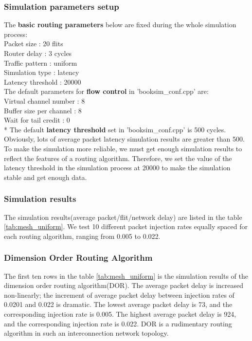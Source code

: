 \subsubsection{Simulation parameters setup}
The \textbf{basic routing parameters} below are fixed during the whole simulation process:\\
Packet size : 20 flits\\
Router delay : 3 cycles\\
Traffic pattern : uniform\\
Simulation type : latency\\
Latency threshold : 20000\\
The default parameters for \textbf{flow control} in 'booksim\_conf.cpp' are: \\
Virtual channel number : 8\\
Buffer size per channel : 8\\
Wait for tail credit : 0\\

* The default \textbf{latency threshold} set in 'booksim\_conf.cpp' is 500 cycles. Obviously, lots of average packet latency simulation results are greater than 500. To make the simulation more reliable, we must get enough simulation results to reflect the features of a routing algorithm. Therefore, we set the value of the latency threshold in the simulation process at 20000 to make the simulation stable and get enough data.
\subsubsection{Simulation results}

The simulation results(average packet/flit/network delay) are listed in the table \ref{tab:mesh_uniform}. We test 10 different packet injection rates equally spaced for each routing algorithm, ranging from 0.005 to 0.022.


\subsubsection{Dimension Order Routing Algorithm}
The first ten rows in the table \ref{tab:mesh_uniform} is the simulation results of the dimension order routing algorithm(DOR). The average packet delay is increased non-linearly; the increment of average packet delay between injection rates of 0.0201 and 0.022 is dramatic. The lowest average packet delay is 73, and the corresponding injection rate is 0.005. The highest average packet delay is 924, and the corresponding injection rate is 0.022. DOR is a rudimentary routing algorithm in such an interconnection network topology.

